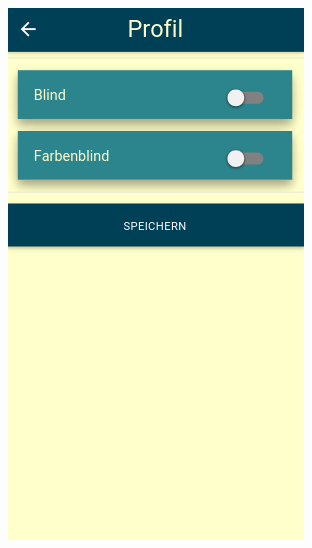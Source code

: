 \begin{figure}[ht]
\begin{flushleft}
\begin{minipage}[b]{.5\textwidth}
  \includegraphics[width=.8\linewidth]{img/profil_final.png}
  \label{img:profil-final}
\end{minipage}
\end{flushleft}
\end{figure}

